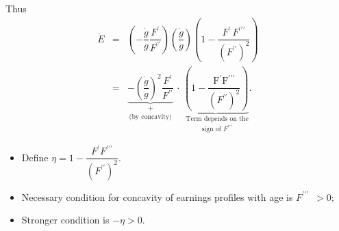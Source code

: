 \documentclass[12pt,compress,handout]{beamer}  %
\begin{document}
\begin{frame}

Thus
\begin{eqnarray*}
    \ddot{E}
    &=&
    \left( -\dfrac{\dot{g}}{g} \dfrac{F^{\prime }}{ F^{\prime \prime}}\right)
    \left( \dfrac{\dot{g}}{g}\right)
    \left( 1-\dfrac{ F^{\prime}\,F^{\prime\prime\prime}}
        {(F^{\prime \prime })^{2}}
    \right) \\
    &=&
    \underset{\text{(by concavity)}}
    {\underset{+}
    {\underbrace{
        -\left( \dfrac{\dot{g}}{g}\right)^{2} \dfrac{ F^{\prime }}{F^{\prime \prime }}
    }}}\,\cdot\,
    \underset{\text{sign of $F^{\prime\prime\prime}$}}
    {\underset{\text{Term depends on the}}
    {\underbrace{
        \left( 1 -\dfrac{\text{F}^{\prime }\text{F}^{\prime \prime \prime }}
            {(F^{\prime \prime})^{\text{2}}}\right)
    }.}}
\end{eqnarray*}
\end{frame}


\begin{frame}
\begin{itemize}[<+->]
\item
Define $\eta = 1-\dfrac{F^{\prime}F^{\prime \prime \prime
}}{(F^{\prime\prime})^{2}}$.\vspace{0.1in}

\item
Necessary condition for concavity of earnings profiles with age is $F^{\prime
\prime \prime }$\ $>0;$\vspace{.2in}

\item
Stronger condition is $- \eta > 0$.
\end{itemize}
\end{frame}
\end{document}

